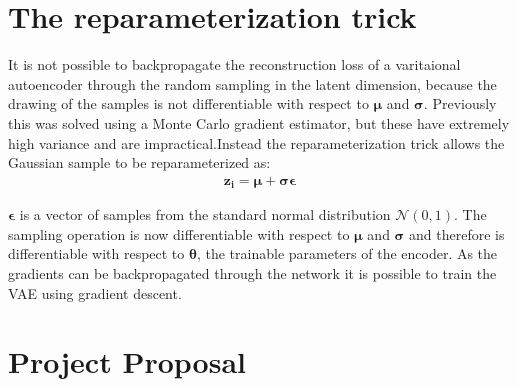 \documentclass[12pt,a4paper,twoside,openright]{report}
\renewcommand{\vec}[1]{\bm{#1}}
\begin{document}
\chapter{The reparameterization trick} \label{reparam}

It is not possible to backpropagate the reconstruction loss of a varitaional autoencoder through the random sampling in the latent dimension, because the drawing of
the samples is not differentiable with respect to $\vec{\mu}$ and $\vec{\sigma}$. Previously this was solved using a Monte Carlo gradient estimator, but these have 
extremely high variance and are impractical.Instead the reparameterization trick allows the Gaussian sample to be reparameterized as:
\begin{align}
  \vec{z_{i}} = \vec{\mu} + \vec{\sigma}\vec{\epsilon}
\end{align}

$\vec{\epsilon}$ is a vector of samples from the standard normal distribution $\mathcal{N}(0, 1)$. The sampling operation is now differentiable
with respect to $\vec{\mu}$ and $\vec{\sigma}$ and therefore is differentiable with respect to $\vec{\theta}$, the trainable parameters of the encoder. As the
gradients can be backpropagated through the network it is possible to train the VAE using gradient descent.

\chapter{Project Proposal} \label{proposal}

\end{document}
